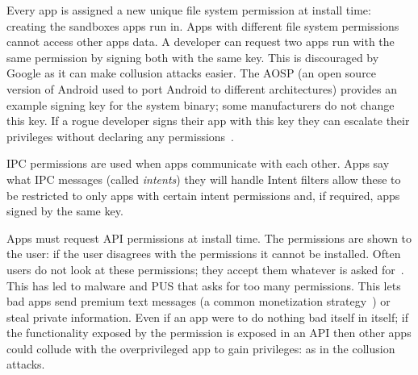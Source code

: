 \documentclass[a4paper,sfsidenotes]{%
  scrartcl%
}
\begin{document}
Every app is assigned a new unique file system permission at install time:
creating the sandboxes apps run in.  Apps with different file system permissions
cannot access other apps data.  A developer can request two apps run with the
same permission by signing both with the same key.  This is discouraged by
Google as it can make collusion attacks easier.  The \ac{AOSP} (an open source
version of Android used to port Android to different architectures) provides an
example signing key for the system binary; some manufacturers do not change this
key.  If a rogue developer signs their app with this key they can escalate their
privileges without declaring any permissions~\cite{Zheng:vb}.

IPC permissions are used when apps communicate with each other.  Apps say what
IPC messages (called \emph{intents}) they will handle  Intent filters allow
these to be restricted to only apps with certain intent permissions and, if
required, apps signed by the same key.

Apps must request API permissions at install time.  The permissions are shown to
the user: if the user disagrees with the permissions it cannot be installed.
Often users do not look at these permissions; they accept them whatever is asked
for~\cite{Felt:2012hm}.  This has led to malware and \ac{PUS} that asks for too
many permissions. This lets bad apps send premium text messages (a common
monetization strategy~\cite{Chien:2011vw}) or steal private information.  Even
if an app were to do nothing bad itself in itself; if the functionality exposed
by the permission is exposed in an API then other apps could collude with the
overprivileged app to gain privileges: as in the collusion attacks.
\end{document}
